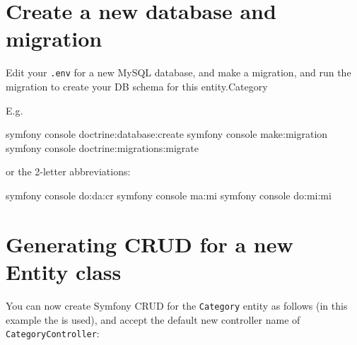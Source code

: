 \documentclass[a4paperpaper,openright]{book}
\newenvironment{Shaded}{}{}
\newcommand{\ExtensionTok}[1]{#1}
\newcommand{\NormalTok}[1]{#1}
\begin{document}
\hypertarget{create-a-new-database-and-migration}{%
\section{Create a new database and
migration}\label{create-a-new-database-and-migration}}

Edit your \texttt{.env} for a new MySQL database, and make a migration,
and run the migration to create your DB schema for this entity.Category

E.g.

\begin{Shaded}
\begin{Highlighting}[]
     \ExtensionTok{symfony}\NormalTok{ console doctrine:database:create}
     \ExtensionTok{symfony}\NormalTok{ console make:migration}
     \ExtensionTok{symfony}\NormalTok{ console doctrine:migrations:migrate}
\end{Highlighting}
\end{Shaded}

or the 2-letter abbreviations:

\begin{Shaded}
\begin{Highlighting}[]
     \ExtensionTok{symfony}\NormalTok{ console do:da:cr}
     \ExtensionTok{symfony}\NormalTok{ console ma:mi}
     \ExtensionTok{symfony}\NormalTok{ console do:mi:mi}
\end{Highlighting}
\end{Shaded}

\hypertarget{generating-crud-for-a-new-entity-class}{%
\section{Generating CRUD for a new Entity
class}\label{generating-crud-for-a-new-entity-class}}

You can now create Symfony CRUD for the \texttt{Category} entity as
follows (in this example the is used), and accept the default new
controller name of \texttt{CategoryController}:
\end{document}

